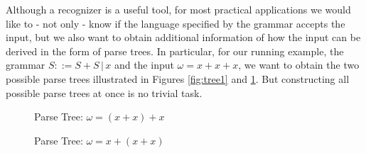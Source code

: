 %
\begin{isabellebody}%
%
%
\isadelimtheory
%
\endisadelimtheory
%
\isatagtheory
%
\endisatagtheory
{\isafoldtheory}%
%
\isadelimtheory
%
\endisadelimtheory
%
\isadelimdocument
%
\endisadelimdocument
%
\isatagdocument
%
\isamarkuptrue%
%
\endisatagdocument
{\isafolddocument}%
%
\isadelimdocument
%
\endisadelimdocument
%
\begin{isamarkuptext}%
Although a recognizer is a useful tool, for most practical applications we would like to - not only -
know if the language specified by the grammar accepts the input, but we also want to obtain additional information
of how the input can be derived in the form of parse trees. In particular, for our running example, the
grammar $S ::= S + S \, | \, x$ and the input $\omega = x + x + x$, we want to obtain the two possible parse
trees illustrated in Figures \ref{fig:tree1} and \ref{fig:tree2}. But constructing all possible parse trees at once is no
trivial task.

\begin{figure}[htpb]
    \centering
    \begin{minipage}{0.45\textwidth}
        \centering
        \caption{Parse Tree: $\omega = (x + x) + x$} \label{fig:tree1}
    \end{minipage}\hfill
    \begin{minipage}{0.45\textwidth}
        \centering
        \caption{Parse Tree: $\omega = x + (x + x)$} \label{fig:tree2}
    \end{minipage}
\end{figure}


\end{isamarkuptext}
\end{isabellebody}
